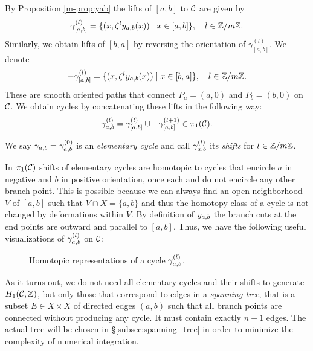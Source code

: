 \documentclass[main.tex]{subfiles}
\begin{document}
   By Proposition \ref{m-prop:yab} the lifts of $[a,b]$ to $\mathcal{C}$ are given by
   \begin{equation*}\label{eq:def_path_ab}
      \gamma^{(l)}_{[a,b]} = \{  (x,\zeta^l y_{a,b}(x))  \mid  x \in [a,b]  \}, \quad l \in \mathbb{Z}/m\mathbb{Z}.
   \end{equation*}
   Similarly, we obtain lifts of $[b,a]$ by reversing the orientation of $\gamma^{(l)}_{[a,b]}$. We denote
   \begin{equation*}\label{eq:def_path_ba}
      -\gamma^{(l)}_{[a,b]} = \{  (x,\zeta^l y_{a,b}(x))  \mid  x \in [b,a]  \}, \quad l \in \mathbb{Z}/m\mathbb{Z}.
   \end{equation*}
   These are smooth oriented paths that connect $P_a = (a,0)$ and $P_b = (b,0)$ on $\mathcal{C}$. We obtain cycles by concatenating these lifts in the following way:
    \begin{equation}\label{eq:def_cyabl}
      \gamma_{a,b}^{(l)} = \gamma^{(l)}_{[a,b]} \cup -\gamma^{(l+1)}_{[a,b]} \in \pi_1(\mathcal{C}).
   \end{equation}
   \begin{defn}\label{def:elem_cycles}
       We say $\gamma_{a,b} = \gamma_{a,b}^{(0)}$ is an \emph{elementary cycle} and call $\gamma_{a,b}^{(l)}$ its \emph{shifts} for $l \in \mathbb{Z}/m\mathbb{Z}$.
   \end{defn}
   In $\pi_1(\mathcal{C})$
   shifts of elementary cycles are homotopic to cycles that encircle $a$ in negative and $b$ in positive orientation, once each and do not encircle any other branch point. 
   This is possible because we can always find
   an open neighborhood $V$ of $[a,b]$ such that $V \cap X = \{a,b\}$ and thus the homotopy class of a cycle is not changed by deformations within $V$.
   By definition of $y_{a,b}$ the branch cuts at the end points are outward and parallel to $[a,b]$. Thus, we have the following useful visualizations of $\gamma_{a,b}^{(l)}$ on $\mathcal{C}$:
   \begin{figure}[H]
      \begin{center}
   
      \end{center}
    \caption{Homotopic representations of a cycle $\gamma_{a,b}^{(l)}$.}
    \label{fig:elem_cycle}
\end{figure}

  \bigskip

  As it turns out, we do not need all elementary cycles and their shifts to
  generate $H_1(\mathcal{C},\mathbb{Z})$, but only those that correspond to edges in a \emph{spanning tree},
  that is a subset $E\in X\times X$ of directed edges $(a,b)$ such that all branch points
  are connected without producing any cycle. It must contain exactly $n-1$ edges.
  The actual tree will be chosen in \S \ref{subsec:spanning_tree} in order to minimize
  the complexity of numerical integration.
\end{document}
